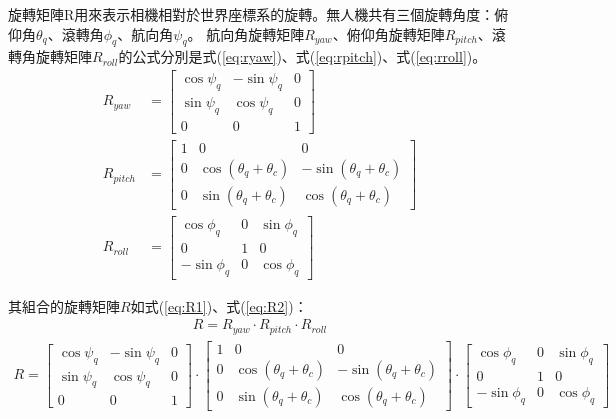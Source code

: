 \documentclass[12pt]{article}       %
\begin{document}
旋轉矩陣R用來表示相機相對於世界座標系的旋轉。無人機共有三個旋轉角度：俯仰角$\theta_{q}$、滾轉角$\phi_{q}$、航向角$\psi_{q}$。
航向角旋轉矩陣$R_{yaw}$、俯仰角旋轉矩陣$R_{pitch}$、滾轉角旋轉矩陣$R_{roll}$的公式分別是式(\ref{eq:ryaw})、式(\ref{eq:rpitch})、式(\ref{eq:rroll})。
\begin{align}
    R_{yaw} &=
    \begin{bmatrix}
        \cos\psi_{q}   & -\sin\psi_{q}  & 0 \\
        \sin\psi_{q}   & \cos\psi_{q}   & 0 \\
        0              & 0              & 1
    \end{bmatrix} 
    \label{eq:ryaw}
    \\
    R_{pitch} &=
    \begin{bmatrix}
        1   & 0  & 0 \\
        0   & \cos(\theta_{q}+\theta_{c})   & -\sin(\theta_{q}+\theta_{c}) \\
        0   & \sin(\theta_{q}+\theta_{c})   & \cos(\theta_{q}+\theta_{c})
    \end{bmatrix} 
    \label{eq:rpitch}
    \\
    R_{roll} &=
    \begin{bmatrix}
        \cos\phi_{q}    & 0     & \sin\phi_{q}  \\
        0               & 1     & 0             \\
        -\sin\phi_{q}   & 0     & \cos\phi_{q}
    \end{bmatrix} 
    \label{eq:rroll}
\end{align}

其組合的旋轉矩陣$R$如式(\ref{eq:R1})、式(\ref{eq:R2})：
\begin{align}
    R=R_{yaw}\cdot R_{pitch} \cdot R_{roll}
    \label{eq:R1}
\end{align}
\begin{align}
    R=
    \begin{bmatrix}
        \cos\psi_{q}   & -\sin\psi_{q}  & 0 \\
        \sin\psi_{q}   & \cos\psi_{q}   & 0 \\
        0              & 0              & 1
    \end{bmatrix} 
    \cdot
    \begin{bmatrix}
        1   & 0  & 0 \\
        0   & \cos(\theta_{q}+\theta_{c})   & -\sin(\theta_{q}+\theta_{c}) \\
        0   & \sin(\theta_{q}+\theta_{c})   & \cos(\theta_{q}+\theta_{c})
    \end{bmatrix} 
    \cdot
    \begin{bmatrix}
        \cos\phi_{q}    & 0     & \sin\phi_{q}  \\
        0               & 1     & 0             \\
        -\sin\phi_{q}   & 0     & \cos\phi_{q}
    \end{bmatrix} 
    \label{eq:R2}
\end{align}
\end{document}
